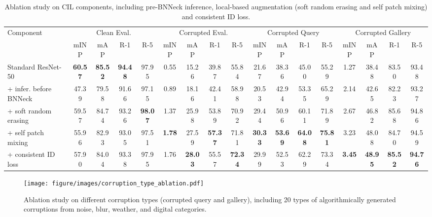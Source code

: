 \setlength{\tabcolsep}{3.2pt}
\begin{table}[t]
    \tiny
    \renewcommand\arraystretch{1.8}
    \centering
    \caption{Ablation study on CIL components, including pre-BNNeck inference, local-based augmentation (soft random erasing and self patch mixing) and consistent ID loss.}
    \vspace{1mm}
    \begin{tabular}{l|cccc|cccc|cccc|cccc}
        \hline
        \multirow{2}{*}{Component} & \multicolumn{4}{c|}{Clean Eval.} & \multicolumn{4}{c|}{Corrupted Eval.} & \multicolumn{4}{c|}{Corrupted Query} & \multicolumn{4}{c}{Corrupted Gallery}                                                                                                               \\
                                      & mINP                             & mAP                                  & R-1                                  & R-5                                     & mINP & mAP   & R-1   & R-5    & mINP  & mAP   & R-1   & R-5   & mINP & mAP   & R-1   & R-5   \\
        \hline
        Standard ResNet-50                      & \textbf{60.57} & \textbf{85.52} & \textbf{94.48} & 97.95 & 0.55 & 15.26 & 39.87 & 55.84 & 21.67 & 38.36 & 45.00 & 55.29 & 1.27 & 38.48 & 83.50 & 93.48  \\
        + infer. before BNNeck & 47.39 & 79.58 & 91.66 & 97.15 & 0.89 & 18.16 & 42.41 & 58.98 & 20.53 & 42.94 & 53.35 & 65.29 & 2.14 & 42.65 & 82.23 & 93.27  \\
        + soft random erasing                       & 59.57 & 84.74 & 93.26 & \textbf{98.07} & 1.37 & 25.98 & 53.89 & 70.92 & 29.44 & 50.96 & 60.11 & 71.89 & 2.67 & 46.82 & 85.68 & 94.86 \\
        + self patch mixing    & 55.96 & 82.93 & 93.05 & 97.51 & \textbf{1.78} & 27.59 & \textbf{57.37} & 71.81 & \textbf{30.33} & \textbf{53.69} & \textbf{64.08} & \textbf{75.81} & 3.23 & 48.08 & 84.70 & 94.59  \\
        + consistent ID loss   & 57.90                            & 84.04                                & 93.38                                & 97.95                                 & 1.76 & \textbf{28.03} & 55.57 & \textbf{72.34} & 29.99 & 52.53 & 62.29 & 73.34 & \textbf{3.45} & \textbf{48.95} & \textbf{85.52} & \textbf{94.76}  \\
        \hline
    \end{tabular}
    \vspace{-3mm}
    \label{tab:CIL_ablation}
\end{table}
 \begin{figure}[htbp]
    \centering
    \texttt{[image: figure/images/corruption\_type\_ablation.pdf]}
    \caption{Ablation study on different corruption types (corrupted query and gallery), including 20 types of algorithmically generated corruptions from noise, blur, weather, and digital categories.}
    \vspace{-5mm}
    \label{fig:corruption_type_ablation}
\end{figure}
 

